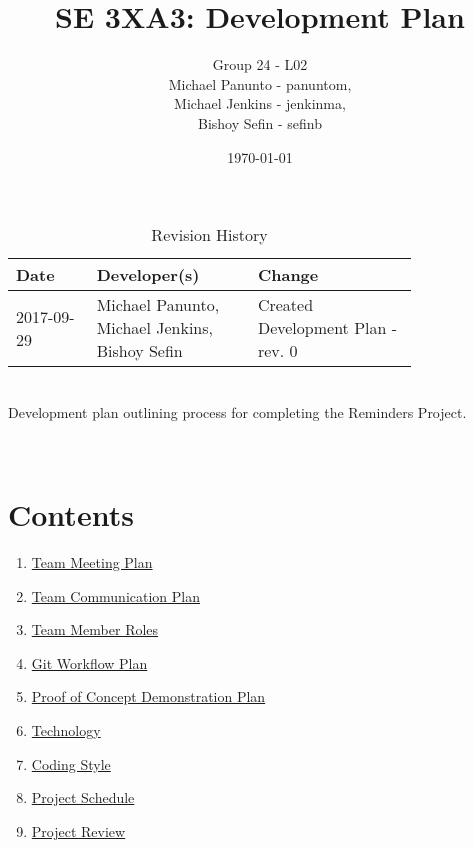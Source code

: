 \documentclass[a4paper]{article}
\title{SE 3XA3: Development Plan}
\author{
    Group 24 - L02 \\
    Michael Panunto - panuntom, \\
    Michael Jenkins - jenkinma, \\
    Bishoy Sefin - sefinb
}
\date{\today}
\begin{document}
\setlength{\arrayrulewidth}{1.5pt}

\begin{table}[H]
\begin{center}
    \caption{Revision History} \label{tab:RevisionHistory}
    \begin{tabular}{l p{0.4\linewidth} p{0.4\linewidth}}
        \hline
        \textbf{Date} & \textbf{Developer(s)} & \textbf{Change} \\
        \hline
        2017-09-29 & Michael Panunto, \newline Michael Jenkins, \newline Bishoy Sefin & Created Development Plan - rev. 0 \\
        \hline 
    \end{tabular}
\end{center}
\end{table}

\newpage
\maketitle

~\\

Development plan outlining process for completing the Reminders Project.

~\\

\section*{Contents}
    \label{sec:Contents}
    \begin{enumerate}
        \item \hyperref[sec:MeetingPlan]{Team Meeting Plan}
        \item \hyperref[sec:CommunicationPlan]{Team Communication Plan}
        \item \hyperref[sec:Roles]{Team Member Roles}
        \item \hyperref[sec:gitWorkflow]{Git Workflow Plan}
        \item \hyperref[sec:ProofOfConcept]{Proof of Concept Demonstration Plan}
        \item \hyperref[sec:Technology]{Technology}
        \item \hyperref[sec:CodingStyle]{Coding Style}
        \item \hyperref[sec:ProjectSchedule]{Project Schedule}
        \item \hyperref[sec:projReview]{Project Review}
    \end{enumerate}
\end{document}
